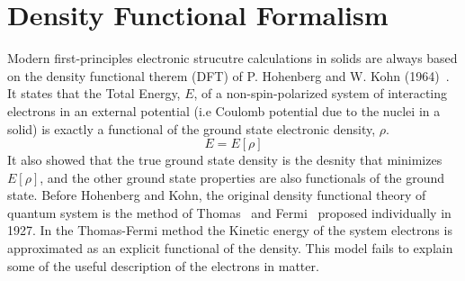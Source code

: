 \section{Density Functional Formalism}
Modern first-principles electronic strucutre calculations in solids are always based on the density functional therem (DFT) of P. Hohenberg and W. Kohn (1964)~\cite{hohenberg1964inhomogeneous}. It states that the Total Energy, $E$, of a non-spin-polarized system of interacting electrons in an external potential (i.e Coulomb potential due to the nuclei in a solid) is exactly a functional of the ground state electronic density, $\rho$.
\begin{equation}
E = E[\rho]
\end{equation}
It also showed that the true ground state density is the desnity that minimizes $E[\rho]$, and the other ground state properties are also functionals of the ground state. Before Hohenberg and Kohn, the original density functional theory of quantum system is the method of Thomas~\cite{thomas1927calculation} and Fermi~\cite{fermi1927metodo} proposed individually in 1927. In the Thomas-Fermi method the Kinetic energy of the system electrons is approximated as an explicit functional of the density. This model fails to explain some of the useful description of the electrons in matter.

